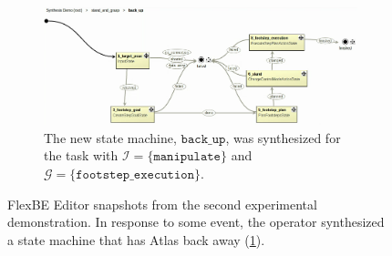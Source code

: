 \begin{figure}[t]
	\vspace{4 pt}
	\begin{subfigure}[b]{0.99\columnwidth}
	\includegraphics[width=0.99\columnwidth, clip]{./img/synthesis_runtime_synthesized_sm.png}
	\caption{The new state machine, $\mathtt{back\_up}$, was synthesized for the task with $\mathcal{I} = \{ \mathtt{manipulate} \}$ and $\mathcal{G} = \{ \mathtt{footstep\_execution} \}$.
	} 
	\label{Fig:runtime2}
	\end{subfigure}
	\caption{
	FlexBE Editor snapshots from the second experimental demonstration.
	In response to some event, the operator synthesized a state machine that has Atlas back away (\ref{Fig:runtime2}).
	}
	\label{Fig:synthesis_runtime_demo}
	\vspace{-10 pt}
\end{figure}

